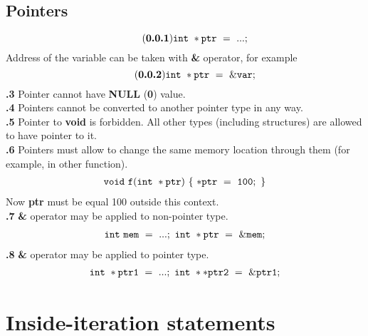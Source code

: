 \documentclass[leqno]{article}
\begin{document}
            \subsection{Pointers}
                \begin{equation} \tag{\textbf{\thesubsection.1}}
                    \tt{int\ *ptr\ =\ ...;}
                \end{equation}
                Address of the variable can be taken with \textbf{\&} operator, for example
                \begin{equation} \tag{\textbf{\thesubsection.2}}
                    \tt{int\ *ptr\ =\ \&var;}
                \end{equation}
                \textbf{\thesubsection.3} Pointer cannot have \textbf{NULL} (\textbf{0}) value. \\
                \textbf{\thesubsection.4} Pointers cannot be converted to another pointer type in any way. \\
                \textbf{\thesubsection.5} Pointer to \textbf{void} is forbidden. All other types (including structures) are allowed to have pointer to it. \\
                \textbf{\thesubsection.6} Pointers must allow to change the same memory
                location through them (for example, in other function).
                \begin{align*}
                    \tt{void\ f(int\ *ptr)\ \{\ *ptr\ =\ 100;\ \} }
                \end{align*}
                Now \textbf{ptr} must be equal 100 outside this context. \\
                \textbf{\thesubsection.7} \textbf{\&} operator may be applied to
                non-pointer type.
                \begin{align*}
                    \tt{int\ mem\ =\ ...;\ int\ *ptr\ =\ \&mem;}
                \end{align*}
                \textbf{\thesubsection.8} \textbf{\&} operator may be applied to pointer
                type.
                \begin{align*}
                    \tt{int\ *ptr1\ =\ ...;\ int\ **ptr2\ =\ \&ptr1;}
                \end{align*}

    \section{Inside-iteration statements}
\end{document}
